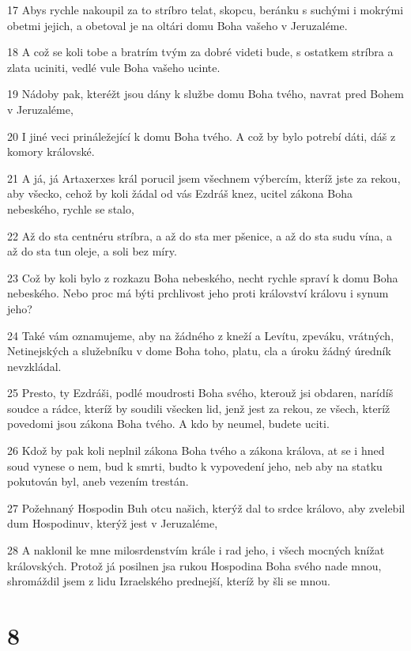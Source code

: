 \par 17 Abys rychle nakoupil za to stríbro telat, skopcu, beránku s suchými i mokrými obetmi jejich, a obetoval je na oltári domu Boha vašeho v Jeruzaléme.
\par 18 A což se koli tobe a bratrím tvým za dobré videti bude, s ostatkem stríbra a zlata uciniti, vedlé vule Boha vašeho ucinte.
\par 19 Nádoby pak, kteréžt jsou dány k službe domu Boha tvého, navrat pred Bohem v Jeruzaléme,
\par 20 I jiné veci prináležející k domu Boha tvého. A což by bylo potrebí dáti, dáš z komory královské.
\par 21 A já, já Artaxerxes král porucil jsem všechnem výbercím, kteríž jste za rekou, aby všecko, cehož by koli žádal od vás Ezdráš knez, ucitel zákona Boha nebeského, rychle se stalo,
\par 22 Až do sta centnéru stríbra, a až do sta mer pšenice, a až do sta sudu vína, a až do sta tun oleje, a soli bez míry.
\par 23 Což by koli bylo z rozkazu Boha nebeského, necht rychle spraví k domu Boha nebeského. Nebo proc má býti prchlivost jeho proti království královu i synum jeho?
\par 24 Také vám oznamujeme, aby na žádného z kneží a Levítu, zpeváku, vrátných, Netinejských a služebníku v dome Boha toho, platu, cla a úroku žádný úredník nevzkládal.
\par 25 Presto, ty Ezdráši, podlé moudrosti Boha svého, kterouž jsi obdaren, narídíš soudce a rádce, kteríž by soudili všecken lid, jenž jest za rekou, ze všech, kteríž povedomi jsou zákona Boha tvého. A kdo by neumel, budete uciti.
\par 26 Kdož by pak koli neplnil zákona Boha tvého a zákona králova, at se i hned soud vynese o nem, bud k smrti, budto k vypovedení jeho, neb aby na statku pokutován byl, aneb vezením trestán.
\par 27 Požehnaný Hospodin Buh otcu našich, kterýž dal to srdce královo, aby zvelebil dum Hospodinuv, kterýž jest v Jeruzaléme,
\par 28 A naklonil ke mne milosrdenstvím krále i rad jeho, i všech mocných knížat královských. Protož já posilnen jsa rukou Hospodina Boha svého nade mnou, shromáždil jsem z lidu Izraelského prednejší, kteríž by šli se mnou.

\chapter{8}

